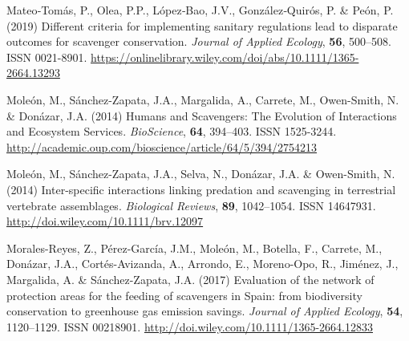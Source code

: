 \documentclass[12pt]{article}
\begin{document}
\begin{thebibliography}{87}
	Mateo‐Tom{\'{a}}s, P., Olea, P.P., L{\'{o}}pez‐Bao, J.V.,
	Gonz{\'{a}}lez‐Quir{\'{o}}s, P. \& Pe{\'{o}}n, P. (2019) {Different
		criteria for implementing sanitary regulations lead to disparate outcomes for
		scavenger conservation}.
	\newblock \emph{Journal of Applied Ecology}, \textbf{56}, 500--508.
	\newblock ISSN 0021-8901.
	\newline\urlprefix\url{https://onlinelibrary.wiley.com/doi/abs/10.1111/1365-2664.13293}
	
	Mole{\'{o}}n, M., S{\'{a}}nchez-Zapata, J.A., Margalida, A., Carrete, M.,
	Owen-Smith, N. \& Don{\'{a}}zar, J.A. (2014{}) {Humans and
		Scavengers: The Evolution of Interactions and Ecosystem Services}.
	\newblock \emph{BioScience}, \textbf{64}, 394--403.
	\newblock ISSN 1525-3244.
	\newline\urlprefix\url{http://academic.oup.com/bioscience/article/64/5/394/2754213}
	
	Mole{\'{o}}n, M., S{\'{a}}nchez-Zapata, J.A., Selva, N., Don{\'{a}}zar, J.A. \&
	Owen-Smith, N. (2014{}) {Inter-specific interactions linking
		predation and scavenging in terrestrial vertebrate assemblages}.
	\newblock \emph{Biological Reviews}, \textbf{89}, 1042--1054.
	\newblock ISSN 14647931.
	\newline\urlprefix\url{http://doi.wiley.com/10.1111/brv.12097}
	
	Morales-Reyes, Z., P{\'{e}}rez-Garc{\'{i}}a, J.M., Mole{\'{o}}n, M., Botella,
	F., Carrete, M., Don{\'{a}}zar, J.A., Cort{\'{e}}s-Avizanda, A., Arrondo, E.,
	Moreno-Opo, R., Jim{\'{e}}nez, J., Margalida, A. \& S{\'{a}}nchez-Zapata,
	J.A. (2017) {Evaluation of the network of protection areas for the feeding of
		scavengers in Spain: from biodiversity conservation to greenhouse gas
		emission savings}.
	\newblock \emph{Journal of Applied Ecology}, \textbf{54}, 1120--1129.
	\newblock ISSN 00218901.
	\newline\urlprefix\url{http://doi.wiley.com/10.1111/1365-2664.12833}
	

\end{thebibliography}
\end{document}
